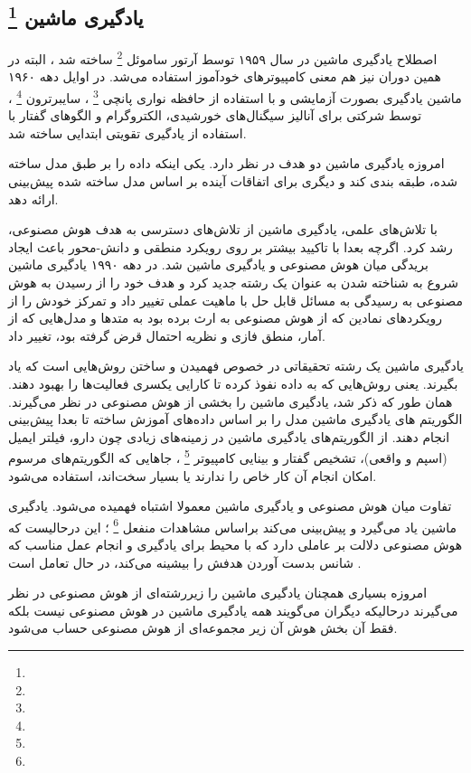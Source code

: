 \documentclass[a4paper, 12pt]{article}
\begin{document}
   \subsection*{یادگیری ماشین
	\footnote{}   
}
اصطلاح یادگیری ماشین در سال ۱۹۵۹ توسط آرتور ساموئل 
\footnote{}
ساخته شد ، البته در همین دوران نیز هم معنی کامپیوتر‌های خودآموز  استفاده می‌شد. در اوایل دهه ۱۹۶۰ ماشین یادگیری بصورت آزمایشی و با استفاده از حافظه نواری پانچی
\footnote{}
، سایبرترون
\footnote{}
، توسط شرکتی برای آنالیز سیگنال‌های خورشیدی، الکتروگرام و الگو‌های گفتار با استفاده از یادگیری تقویتی ابتدایی  ساخته شد. 

امروزه یادگیری ماشین دو هدف در نظر دارد. یکی اینکه داده را بر طبق مدل ساخته شده، طبقه بندی کند و دیگری برای اتفاقات آینده بر اساس مدل ساخته شده پیش‌بینی ارائه دهد. 

با تلاش‌های علمی، یادگیری ماشین از تلاش‌های دسترسی به هدف هوش مصنوعی، رشد کرد. اگرچه بعدا با تاکیید بیشتر بر روی  رویکرد منطقی و دانش-محور باعث ایجاد بریدگی میان هوش مصنوعی و یادگیری ماشین شد. در دهه ۱۹۹۰ یادگیری ماشین شروع به شناخته شدن به عنوان یک رشته جدید کرد و هدف خود را از رسیدن به هوش مصنوعی  به  رسیدگی به مسائل قابل حل با ماهیت عملی  تغییر داد و تمرکز خودش را از رویکرد‌های نمادین که از هوش مصنوعی به ارث برده بود به متد‌ها و مدل‌هایی که از آمار، منطق فازی و نظریه احتمال قرض گرفته بود، تغییر داد. 

یادگیری ماشین یک رشته تحقیقاتی در خصوص فهمیدن و ساختن روش‌هایی است که یاد بگیرند. یعنی روش‌هایی که به داده نفوذ کرده تا کارایی یکسری فعالیت‌ها را بهبود دهند. همان طور که ذکر شد، یادگیری ماشین را بخشی از هوش مصنوعی در نظر می‌گیرند. الگوریتم های یادگیری ماشین مدل را بر اساس داده‌های آموزش ساخته تا بعدا پیش‌بینی انجام دهند. از الگوریتم‌های یادگیری ماشین در زمینه‌های زیادی چون دارو، فیلتر ایمیل (اسپم و واقعی)، تشخیص گفتار و بینایی کامپیوتر
\footnote{}
، جاهایی که الگوریتم‌های مرسوم امکان انجام آن کار خاص را ندارند یا بسیار سخت‌اند، استفاده می‌شود. 


تفاوت میان هوش مصنوعی و یادگیری ماشین معمولا اشتباه فهمیده می‌شود. یادگیری ماشین یاد می‌گیرد و پیش‌بینی می‌کند براساس مشاهدات منفعل 
\footnote{}
؛ این درحالیست که هوش مصنوعی دلالت بر عاملی دارد که با محیط برای یادگیری و انجام عمل مناسب که شانس بدست آوردن هدفش را بیشینه می‌کند، در حال تعامل است .  

امروزه بسیاری همچنان یادگیری ماشین را زیررشته‌ای از هوش مصنوعی در نظر می‌گیرند درحالیکه دیگران می‌گویند همه یادگیری ماشین در هوش مصنوعی نیست بلکه فقط آن بخش هوش آن زیر مجموعه‌ای از هوش مصنوعی حساب می‌شود. 
\end{document}
